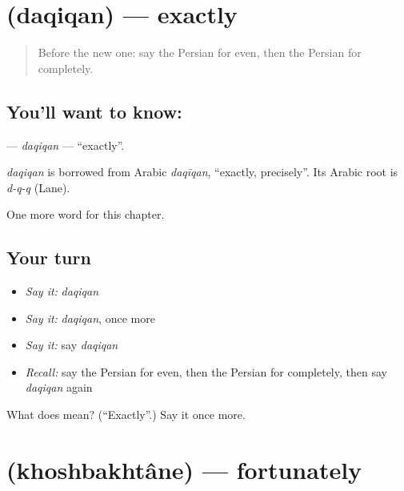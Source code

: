 \section[\texorpdfstring{\fa{دقیقا} (daqiqan)}{دقیقا (daqiqan)}]{ (daqiqan) — exactly}

\label{lesson:FA-C269-daqiqan}



\begin{quote}
Before the new one: say the Persian for even, then the Persian for completely.
\end{quote}

\subsection*{You'll want to know: }
\textbf{} — \emph{daqiqan} — \textquotedblleft{}exactly\textquotedblright{}.

\begin{cousinweb}
\emph{daqiqan} is borrowed from Arabic \emph{daqīqan}, \textquotedblleft{}exactly, precisely\textquotedblright{}. Its Arabic root is \emph{d-q-q} (Lane).
\end{cousinweb}

\begin{grammarlens}[title={What you've built}]
One more word for this chapter.
\end{grammarlens}

\subsection*{Your turn}
\begin{itemize}
\raggedright
  \item \emph{Say it:} \emph{daqiqan}
  \item \emph{Say it:} \emph{daqiqan}, once more
  \item \emph{Say it:} say \emph{daqiqan}
  \item \emph{Recall:} say the Persian for even, then the Persian for completely, then say \emph{daqiqan} again
\end{itemize}

\begin{tcolorbox}[breakable,colback=teal!4,colframe=teal!35!black,title={Before you move on}]
What does  mean? (\textquotedblleft{}Exactly\textquotedblright{}.) Say it once more.
\end{tcolorbox}
\section[\texorpdfstring{\fa{خوشبختانه} (khoshbakhtâne)}{خوشبختانه (khoshbakhtâne)}]{ (khoshbakhtâne) — fortunately}

